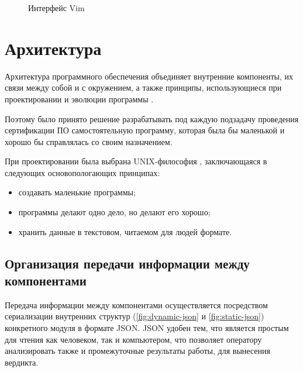 \begin{figure}[!htbp]
    \caption{Интерфейс Vim {\ProgModule}\label{fig:vim-tui}}
\end{figure}

\section{Архитектура {\ProgModule}}\label{sec:ch2/sec2}
Архитектура программного обеспечения объединяет внутренние
компоненты, их связи между собой и с окружением, а также принципы,
использующиеся при проектировании и эволюции программы \autocite{software-architecture}.

Поэтому было принято решение разрабатывать под каждую подзадачу проведения сертификации ПО
самостоятельную программу, которая была бы маленькой и хорошо бы справлялась со своим назначением.

При проектировании {\ProgModule} была выбрана UNIX-философия \autocite{unix-philosophy},
заключающаяся в следующих основопологающих принципах:
\begin{itemize}
    \item создавать маленькие программы;
    \item программы делают одно дело, но делают его хорошо;
    \item хранить данные в текстовом, читаемом для людей формате.
\end{itemize}

\subsection{Организация передачи информации между компонентами {\ProgModule}}\label{sec:ch2/sec2/sub1}
Передача информации между компонентами {\ProgModule} осуществляется посредством
сериализации внутренних структур (\autoref{fig:dynamic-json} и \autoref{fig:static-json})
конкретного модуля в формате JSON. JSON удобен тем, что является простым для 
чтения как человеком, так и компьютером, что позволяет оператору 
анализировать также и промежуточные результаты работы, для
вынесения вердикта.

